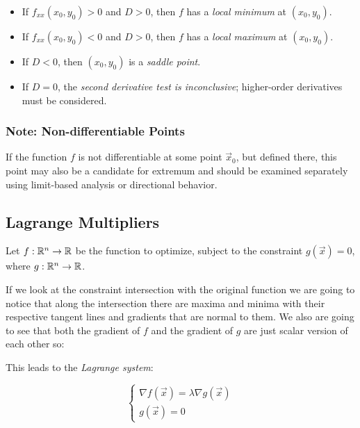 \begin{itemize}

    \item If \( f_{xx}(x_0, y_0) > 0 \) and \( D > 0 \), then \(f\) has a \emph{local minimum} at 
          \( (x_0, y_0) \).

    \item If \( f_{xx}(x_0, y_0) < 0 \) and \( D > 0 \), then \(f\) has a \emph{local maximum} at 
          \( (x_0, y_0) \).

    \item If \( D < 0 \), then \( (x_0, y_0) \) is a \emph{saddle point}.

    \item If \( D = 0 \), the \emph{second derivative test is inconclusive}; higher-order derivatives 
          must be considered.

\end{itemize}

\subsubsection{Note: Non-differentiable Points}

If the function \(f\) is not differentiable at some point \( \vec{x}_0 \), but defined there, this 
point may also be a candidate for extremum and should be examined separately using limit-based analysis 
or directional behavior.

\subsection{Lagrange Multipliers}

Let \( f : \mathbb{R}^n \to \mathbb{R} \) be the function to optimize, subject to the constraint 
\( g(\vec{x}) = 0 \), where \( g : \mathbb{R}^n \to \mathbb{R} \).  

If we look at the constraint intersection with the original function we are going to notice that along 
the intersection there are maxima and minima with their respective tangent lines and gradients that are 
normal to them. We also are going to see that both the gradient of \(f\) and the gradient of \(g\) are just scalar version of each other so: 

This leads to the \emph{Lagrange system}:

\[
    \begin{cases}
        \nabla f(\vec{x}) = \lambda \nabla g(\vec{x}) \\
        g(\vec{x}) = 0
    \end{cases}
\]


